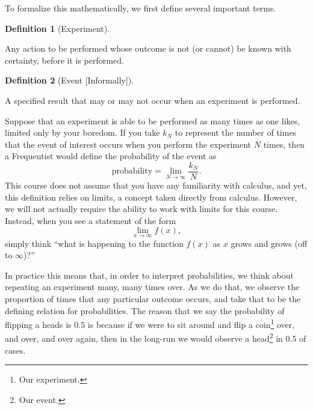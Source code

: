 \documentclass[
  letterpaper,
  DIV=11,
  numbers=noendperiod]{scrreprt}
\theoremstyle{definition}
\theoremstyle{definition}
\theoremstyle{definition}
\newtheorem{definition}{Definition}[chapter]
\theoremstyle{remark}
\begin{document}
To formalize this mathematically, we first define several important
terms.

\begin{definition}[Experiment]\protect\hypertarget{def-experiment}{}\label{def-experiment}

Any action to be performed whose outcome is not (or cannot) be known
with certainty, before it is performed.

\end{definition}

\begin{definition}[Event
{[}Informally{]}]\protect\hypertarget{def-event-inf}{}\label{def-event-inf}

A specified result that may or may not occur when an experiment is
performed.

\end{definition}

Suppose that an experiment is able to be performed as many times as one
likes, limited only by your boredom. If you take \(k_N\) to represent
the number of times that the event of interest occurs when you perform
the experiment \(N\) times, then a Frequentist would define the
probability of the event as
\[\text{probability} = \lim_{N\to\infty}\frac{k_N}{N}.\] This course
does not assume that you have any familiarity with calculus, and yet,
this definition relies on limits, a concept taken directly from
calculus. However, we will not actually require the ability to work with
limits for this course. Instead, when you see a statement of the form
\[\lim_{x\to\infty} f(x),\] simply think ``what is happening to the
function \(f(x)\) as \(x\) grows and grows (off to \(\infty\))?''

In practice this means that, in order to interpret probabilities, we
think about repeating an experiment many, many times over. As we do
that, we observe the proportion of times that any particular outcome
occurs, and take that to be the defining relation for probabilities. The
reason that we say the probability of flipping a heads is \(0.5\) is
because if we were to sit around and flip a coin\footnote{Our
  experiment.} over, and over, and over again, then in the long-run we
would observe a head\footnote{Our event.} in \(0.5\) of cases.
\end{document}

